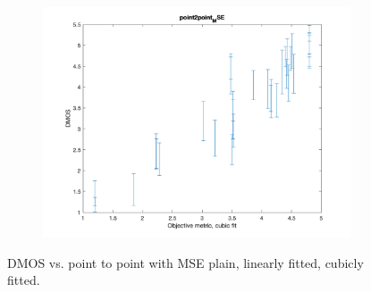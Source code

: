 \documentclass{article}
\begin{document}
\begin{figure}
   \begin{subfigure}[b]{0.65\textwidth}
   \includegraphics[width=\textwidth]{Figures/task3/p2p_mse_cubic.png}
   \end{subfigure}
    \caption{DMOS vs. point to point with MSE plain, linearly fitted, cubicly fitted.}
    \label{fig:p2p_mse_fitted}
\end{figure}
\end{document}
